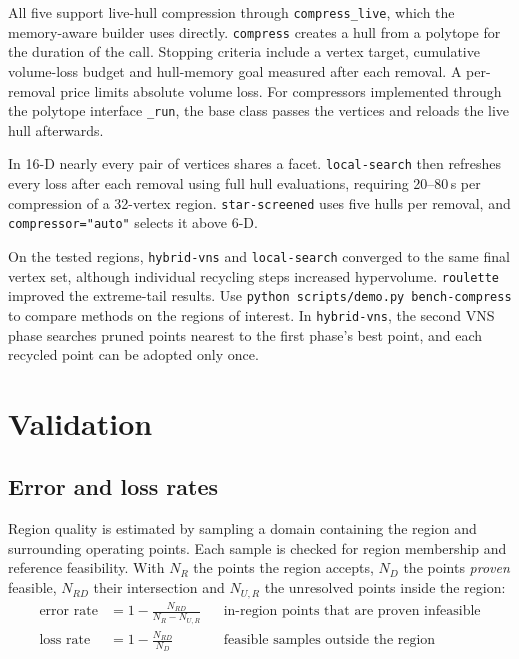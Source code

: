 \documentclass[11pt,a4paper]{report}
\newcommand{\why}[1]{\par\medskip\begingroup\noindent #1\par\endgroup\medskip}
\newcommand{\trap}[1]{\begin{warnbox}#1\end{warnbox}}
\newcommand{\code}[1]{\texttt{\small #1}}
\begin{document}
All five support live-hull compression through \code{compress\_live}, which
the memory-aware builder uses directly. \code{compress} creates a hull from a
polytope for the duration of the call. Stopping criteria include a vertex
target, cumulative volume-loss budget and hull-memory goal measured after each
removal. A per-removal price limits absolute volume loss. For compressors
implemented through the polytope interface \code{\_run}, the base class passes
the vertices and reloads the live hull afterwards.

\why{In 16-D nearly every pair of vertices shares a facet. \code{local-search}
then refreshes every loss after each removal using full hull evaluations,
requiring 20--80\,s per compression of a 32-vertex region.
\code{star-screened} uses five hulls per removal, and
\code{compressor="auto"} selects it above 6-D.}

\trap{On the tested regions, \code{hybrid-vns} and \code{local-search}
converged to the same final vertex set, although individual recycling steps
increased hypervolume. \code{roulette} improved the extreme-tail results.
Use \code{python scripts/demo.py bench-compress} to compare methods on the
regions of interest. In \code{hybrid-vns}, the second VNS phase searches pruned
points nearest to the first phase's best point, and each recycled point can be
adopted only once.}

\chapter{Validation}
\label{ch:validation}

\section{Error and loss rates}

Region quality is estimated by sampling a domain containing the region and
surrounding operating points. Each sample is checked for region membership
and reference feasibility. With $N_R$ the points the region
accepts, $N_D$ the points \emph{proven} feasible, $N_{RD}$ their intersection
and $N_{U,R}$ the unresolved points inside the region:
\begin{align}
\text{error rate} &= 1 - \frac{N_{RD}}{N_R - N_{U,R}}
  &&\text{in-region points that are proven infeasible} \\
\text{loss rate}  &= 1 - \frac{N_{RD}}{N_D}
  &&\text{feasible samples outside the region}
\end{align}
\end{document}
